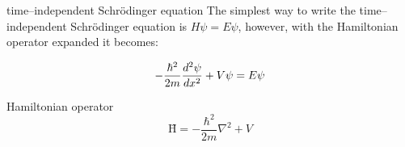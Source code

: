 \documentclass[avery5371,grid]{flashcards}
\begin{document}
\begin{flashcard}[Equation]{time--independent Schr\"odinger equation}
The simplest way to write the time--independent Schr\"odinger equation is
$H\psi = E\psi$, however, with the Hamiltonian operator expanded it becomes:

\medskip
\begin{displaymath}
-\frac{\hbar^2}{2m} \frac{d^2 \psi}{dx^2} + V\psi = E\psi\\
\end{displaymath}
\end{flashcard}

\begin{flashcard}[Definition]{Hamiltonian operator}
\begin{displaymath}
\textrm{\^H} = -\frac{\hbar^2}{2m}\nabla^2 + V
\end{displaymath}
\end{flashcard}
\end{document}
